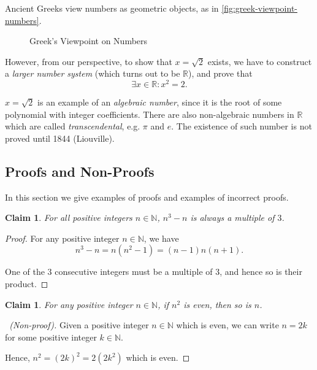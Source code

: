 \documentclass{article}
\newtheorem{claim}[theorem]{Claim}
\theoremstyle{definition}
\theoremstyle{remark}
\newcommand{\pqty}[1]{\left(#1\right)}
\newcommand{\NN}{\mathbb{N}}
\newcommand{\RR}{\mathbb{R}}
\begin{document}
Ancient Greeks view numbers as geometric objects, as in \autoref{fig:greek-viewpoint-numbers}.

\begin{figure}[ht!]
    \centering
    \caption{Greek's Viewpoint on Numbers}
    \label{fig:greek-viewpoint-numbers}
\end{figure}

However, from our perspective, to show that \(x = \sqrt{2}\) exists, we have to construct a \emph{larger number system} (which turns out to be \(\RR\)), and prove that
\[
    \exists x \in \RR: x^2 = 2.
\]

\(x = \sqrt{2}\) is an example of an \emph{algebraic number}, since it is the root of some polynomial with integer coefficients. There are also non-algebraic numbers in \(\RR\) which are called \emph{transcendental}, e.g. \(\pi\) and \(e\). The existence of such number is not proved until 1844 (Liouville).

\subsection{Proofs and Non-Proofs}
\label{sec:proofs-non-proofs}

In this section we give examples of proofs and examples of incorrect proofs.

\begin{claim}
    For all positive integers \(n \in \NN\), \(n^3 - n\) is always a multiple of \(3\).
\end{claim}

\begin{proof}
    For any positive integer \(n \in \NN\), we have
    \[
        n^3 - n = n \pqty{n^2 - 1} = \pqty{n - 1} n \pqty{n + 1}.
    \]

    One of the \(3\) consecutive integers must be a multiple of \(3\), and hence so is their product.
\end{proof}

\begin{claim}
    For any positive integer \(n \in \NN\), if \(n^2\) is even, then so is \(n\).
\end{claim}

\begin{proof}[\proofname\ (Non-proof)]
    Given a positive integer \(n \in \NN\) which is even, we can write \(n = 2k\) for some positive integer \(k \in \NN\).

    Hence, \(n^2 = \pqty{2k}^2 = 2 \pqty{2k^2}\) which is even.
\end{proof}
\end{document}
